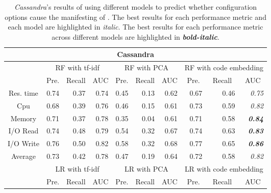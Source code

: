 \begin{table*}
\centering
\caption{\emph{Cassandra}'s results of using different models to predict whether configuration options cause the manifesting of \inconsistent. The best results for each performance metric and each model are highlighted in \textit{italic}. The best results for each performance metric across different models are highlighted in \textbf{\textit{bold-italic}}.}
\begin{tabular}{|c|r|r|r|r|r|r|r|r|r|}
\hline
\multicolumn{10}{|c|}{Cassandra}          \\ \hline
\multirow{2}{*}{} & \multicolumn{3}{c|}{RF with tf-idf}      & \multicolumn{3}{c|}{RF with PCA}         & \multicolumn{3}{c|}{RF with code embedding}                   \\ \cline{2-10} 
                  & \multicolumn{1}{c|}{Pre.} & \multicolumn{1}{c|}{Recall} & \multicolumn{1}{c|}{AUC} & \multicolumn{1}{c|}{Pre.} & \multicolumn{1}{c|}{Recall} & \multicolumn{1}{c|}{AUC} & \multicolumn{1}{c|}{Pre.} & \multicolumn{1}{c|}{Recall} & \multicolumn{1}{c|}{AUC} \\ \hline
Res. time         & 0.74 & 0.37   & 0.74& 0.45 & 0.13   & 0.62& 0.67 & 0.46   & \textit{0.75}            \\ \hline
Cpu               & 0.68 & 0.39   & 0.76& 0.46 & 0.15   & 0.61& 0.73 & 0.59   & \textit{0.82}            \\ \hline
Memory            & 0.71 & 0.37   & 0.78& 0.35 & 0.04   & 0.61& 0.71 & 0.58   & \textit{\textbf{0.84}}   \\ \hline
I/O Read          & 0.74 & 0.48   & 0.79& 0.54 & 0.32   & 0.67& 0.74 & 0.63   & \textit{\textbf{0.83}}   \\ \hline
I/O Write         & 0.76 & 0.50   & 0.82& 0.58 & 0.32   & 0.68& 0.77 & 0.65   & \textit{\textbf{0.86}}   \\ \hline
Average           & 0.73 & 0.42   & 0.78& 0.47 & 0.19   & 0.64& 0.72 & 0.58   & \textit{0.82}            \\ \hline
\multirow{2}{*}{} & \multicolumn{3}{c|}{LR with tf-idf}      & \multicolumn{3}{c|}{LR with PCA}         & \multicolumn{3}{c|}{LR with code embedding}                   \\ \cline{2-10} 
                  & \multicolumn{1}{c|}{Pre.} & \multicolumn{1}{c|}{Recall} & \multicolumn{1}{c|}{AUC} & \multicolumn{1}{c|}{Pre.} & \multicolumn{1}{c|}{Recall} & \multicolumn{1}{c|}{AUC} & \multicolumn{1}{c|}{Pre.} & \multicolumn{1}{c|}{Recall} & \multicolumn{1}{c|}{AUC} \\ \hline

\end{tabular}
\end{table*}
